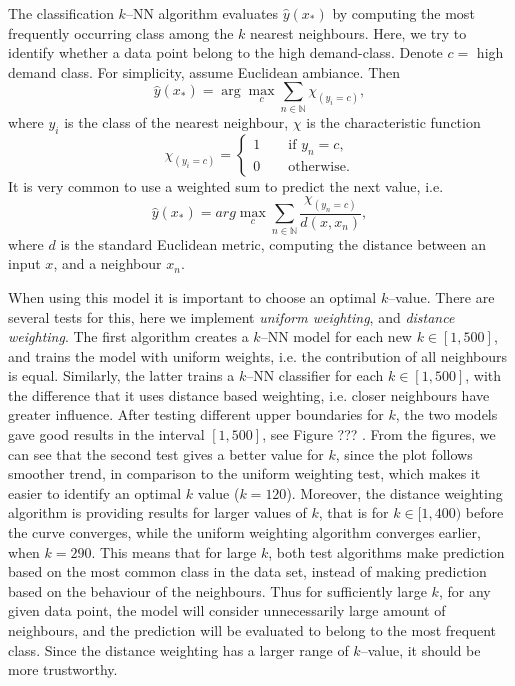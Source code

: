     The classification  $k$--NN algorithm evaluates $\hat{y}(x_{*})$ by computing the most frequently occurring class among the $k$ nearest neighbours. Here, we try to identify whether a data point belong to the high demand-class. Denote $c=$ high demand class. For simplicity, assume Euclidean ambiance. Then
        \begin{equation*}
            \hat{y}(x_*) = \arg \max_{c}  \sum_{n \in \mathbb{N}} \chi_{(y_i = c)} ,
        \end{equation*}
    where $y_i$ is the class of the nearest neighbour,  $\chi$ is the characteristic function 
        \begin{equation*}
            \chi_{(y_i = c)} = 
            \begin{cases}
                1 \qquad \text{if } y_n = c, \\
                0 \qquad \text{otherwise}.
                
            \end{cases}
        \end{equation*}
    It is very common to use a weighted sum to predict the next value, i.e.
        \begin{equation*}
            \hat{y}(x_*) =  arg \max_{c}  \sum_{n \in \mathbb{N}} \frac{\chi_{(y_n = c)}}{d(x, x_n)},
        \end{equation*}
    where $d$ is the standard Euclidean metric, computing the distance between an input $x$, and a neighbour $x_n$. 

    When using this model it is important to choose an optimal $k$--value. There are several tests for this, here we implement \emph{uniform weighting}, and \emph{distance weighting}. The first algorithm creates a $k$--NN model for each new $k \in [1, 500]$, and trains the model with uniform weights, i.e. the contribution of all neighbours is equal. Similarly, the latter trains a $k$--NN classifier for each $k \in [1, 500]$, with the difference that it uses distance based weighting, i.e. closer neighbours have greater influence. After testing different upper boundaries for $k$, the two models gave good results in the interval $[1,500]$, see Figure ??? . From the figures, we can see that the second test gives a better value for $k$, since the plot follows smoother trend, in comparison to the uniform weighting test, which makes it easier to identify an optimal $k$ value ($k = 120$). Moreover, the distance weighting algorithm is providing results for larger values of $k$, that is for $k \in [1, 400)$ before the curve converges, while the uniform weighting algorithm converges earlier, when $k = 290$. This means that for large $k$, both test algorithms make prediction based on the most common class in the data set, instead of making prediction based on the behaviour of the neighbours. Thus for sufficiently large $k$, for any given data point, the model will consider unnecessarily large amount of neighbours, and the prediction will be evaluated to belong to the most frequent class. Since the distance weighting has a larger range of $k$--value, it should be more trustworthy.
    

